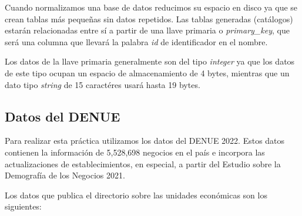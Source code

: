 \documentclass{article}
\begin{document}
Cuando normalizamos una base de datos reducimos su espacio en disco ya que se
crean tablas más pequeñas sin datos repetidos. Las tablas generadas (catálogos)
estarán relacionadas entre sí a partir de una llave primaria o
\textit{primary\_key}, que será una columna que llevará la palabra
\textit{id} de identificador en el nombre. 

Los datos de la llave primaria generalmente son del tipo \textit{integer} ya que
los datos de este tipo ocupan un espacio de almacenamiento de 4 bytes, mientras
que un dato tipo \textit{string} de 15 caractéres usará hasta 19 bytes.

\subsection*{Datos del DENUE}

Para realizar esta práctica utilizamos los datos del DENUE 2022. Estos datos
contienen la información de 5,528,698 negocios en el país e incorpora las
actualizaciones de establecimientos, en especial, a partir del Estudio sobre la
Demografía de los Negocios 2021.

Los datos que publica el directorio sobre las unidades económicas son los
siguientes:
\end{document}

